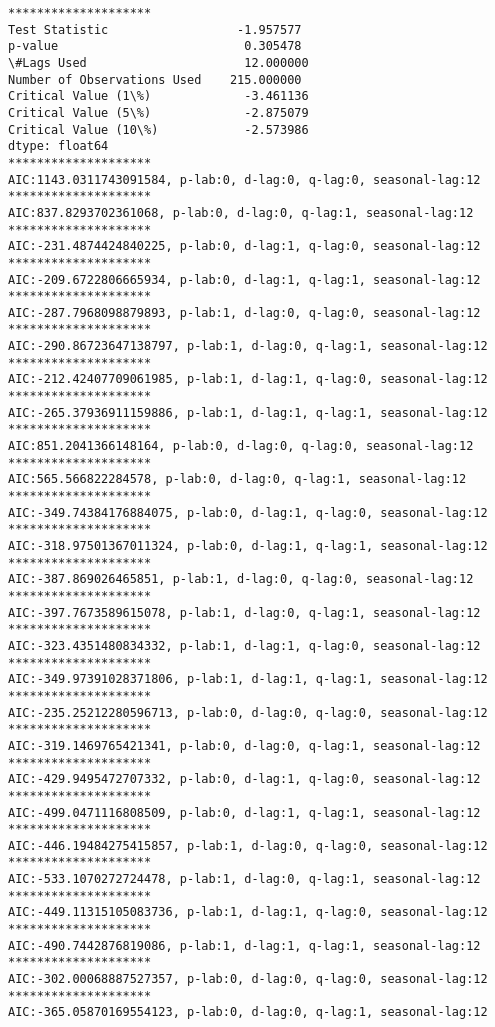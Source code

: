 \documentclass[11pt]{article}
\begin{document}
    \begin{Verbatim}[commandchars=\\\{\}]
********************
Test Statistic                  -1.957577
p-value                          0.305478
\#Lags Used                      12.000000
Number of Observations Used    215.000000
Critical Value (1\%)             -3.461136
Critical Value (5\%)             -2.875079
Critical Value (10\%)            -2.573986
dtype: float64
********************
AIC:1143.0311743091584, p-lab:0, d-lag:0, q-lag:0, seasonal-lag:12
********************
AIC:837.8293702361068, p-lab:0, d-lag:0, q-lag:1, seasonal-lag:12
********************
AIC:-231.4874424840225, p-lab:0, d-lag:1, q-lag:0, seasonal-lag:12
********************
AIC:-209.6722806665934, p-lab:0, d-lag:1, q-lag:1, seasonal-lag:12
********************
AIC:-287.7968098879893, p-lab:1, d-lag:0, q-lag:0, seasonal-lag:12
********************
AIC:-290.86723647138797, p-lab:1, d-lag:0, q-lag:1, seasonal-lag:12
********************
AIC:-212.42407709061985, p-lab:1, d-lag:1, q-lag:0, seasonal-lag:12
********************
AIC:-265.37936911159886, p-lab:1, d-lag:1, q-lag:1, seasonal-lag:12
********************
AIC:851.2041366148164, p-lab:0, d-lag:0, q-lag:0, seasonal-lag:12
********************
AIC:565.566822284578, p-lab:0, d-lag:0, q-lag:1, seasonal-lag:12
********************
AIC:-349.74384176884075, p-lab:0, d-lag:1, q-lag:0, seasonal-lag:12
********************
AIC:-318.97501367011324, p-lab:0, d-lag:1, q-lag:1, seasonal-lag:12
********************
AIC:-387.869026465851, p-lab:1, d-lag:0, q-lag:0, seasonal-lag:12
********************
AIC:-397.7673589615078, p-lab:1, d-lag:0, q-lag:1, seasonal-lag:12
********************
AIC:-323.4351480834332, p-lab:1, d-lag:1, q-lag:0, seasonal-lag:12
********************
AIC:-349.97391028371806, p-lab:1, d-lag:1, q-lag:1, seasonal-lag:12
********************
AIC:-235.25212280596713, p-lab:0, d-lag:0, q-lag:0, seasonal-lag:12
********************
AIC:-319.1469765421341, p-lab:0, d-lag:0, q-lag:1, seasonal-lag:12
********************
AIC:-429.9495472707332, p-lab:0, d-lag:1, q-lag:0, seasonal-lag:12
********************
AIC:-499.0471116808509, p-lab:0, d-lag:1, q-lag:1, seasonal-lag:12
********************
AIC:-446.19484275415857, p-lab:1, d-lag:0, q-lag:0, seasonal-lag:12
********************
AIC:-533.1070272724478, p-lab:1, d-lag:0, q-lag:1, seasonal-lag:12
********************
AIC:-449.11315105083736, p-lab:1, d-lag:1, q-lag:0, seasonal-lag:12
********************
AIC:-490.7442876819086, p-lab:1, d-lag:1, q-lag:1, seasonal-lag:12
********************
AIC:-302.00068887527357, p-lab:0, d-lag:0, q-lag:0, seasonal-lag:12
********************
AIC:-365.05870169554123, p-lab:0, d-lag:0, q-lag:1, seasonal-lag:12

    \end{Verbatim}
\end{document}
